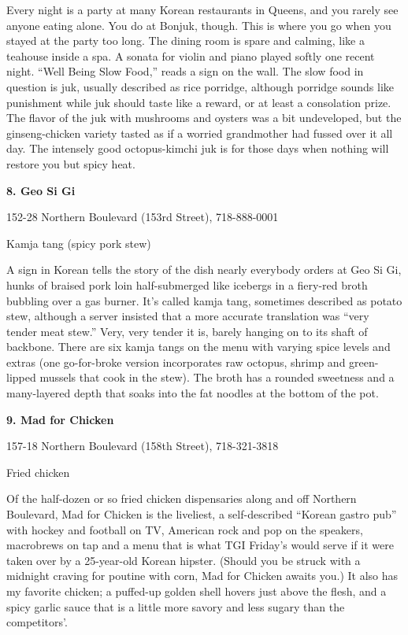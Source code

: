Every night is a party at many Korean restaurants in Queens, and you
rarely see anyone eating alone. You do at Bonjuk, though. This is where
you go when you stayed at the party too long. The dining room is spare
and calming, like a teahouse inside a spa. A sonata for violin and piano
played softly one recent night. ``Well Being Slow Food,'' reads a sign
on the wall. The slow food in question is juk, usually described as rice
porridge, although porridge sounds like punishment while juk should
taste like a reward, or at least a consolation prize. The flavor of the
juk with mushrooms and oysters was a bit undeveloped, but the
ginseng-chicken variety tasted as if a worried grandmother had fussed
over it all day. The intensely good octopus-kimchi juk is for those days
when nothing will restore you but spicy heat.

\textbf{8. Geo Si Gi}

152-28 Northern Boulevard (153rd Street), 718-888-0001

Kamja tang (spicy pork stew)

A sign in Korean tells the story of the dish nearly everybody orders at
Geo Si Gi, hunks of braised pork loin half-submerged like icebergs in a
fiery-red broth bubbling over a gas burner. It's called kamja tang,
sometimes described as potato stew, although a server insisted that a
more accurate translation was ``very tender meat stew.'' Very, very
tender it is, barely hanging on to its shaft of backbone. There are six
kamja tangs on the menu with varying spice levels and extras (one
go-for-broke version incorporates raw octopus, shrimp and green-lipped
mussels that cook in the stew). The broth has a rounded sweetness and a
many-layered depth that soaks into the fat noodles at the bottom of the
pot.

\textbf{9. Mad for Chicken}

157-18 Northern Boulevard (158th Street), 718-321-3818

Fried chicken

Of the half-dozen or so fried chicken dispensaries along and off
Northern Boulevard, Mad for Chicken is the liveliest, a self-described
``Korean gastro pub'' with hockey and football on TV, American rock and
pop on the speakers, macrobrews on tap and a menu that is what TGI
Friday's would serve if it were taken over by a 25-year-old Korean
hipster. (Should you be struck with a midnight craving for poutine with
corn, Mad for Chicken awaits you.) It also has my favorite chicken; a
puffed-up golden shell hovers just above the flesh, and a spicy garlic
sauce that is a little more savory and less sugary than the
competitors'.

